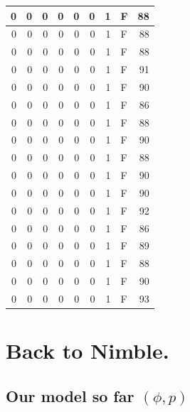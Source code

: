 \documentclass[
  12pt,
]{krantz}
\begin{document}
\begin{tabular}{r|r|r|r|r|r|r|l|r}
\hline
0 & 0 & 0 & 0 & 0 & 0 & 1 & F & 88\\
\hline
0 & 0 & 0 & 0 & 0 & 0 & 1 & F & 88\\
\hline
0 & 0 & 0 & 0 & 0 & 0 & 1 & F & 88\\
\hline
0 & 0 & 0 & 0 & 0 & 0 & 1 & F & 91\\
\hline
0 & 0 & 0 & 0 & 0 & 0 & 1 & F & 90\\
\hline
0 & 0 & 0 & 0 & 0 & 0 & 1 & F & 86\\
\hline
0 & 0 & 0 & 0 & 0 & 0 & 1 & F & 88\\
\hline
0 & 0 & 0 & 0 & 0 & 0 & 1 & F & 90\\
\hline
0 & 0 & 0 & 0 & 0 & 0 & 1 & F & 88\\
\hline
0 & 0 & 0 & 0 & 0 & 0 & 1 & F & 90\\
\hline
0 & 0 & 0 & 0 & 0 & 0 & 1 & F & 90\\
\hline
0 & 0 & 0 & 0 & 0 & 0 & 1 & F & 92\\
\hline
0 & 0 & 0 & 0 & 0 & 0 & 1 & F & 86\\
\hline
0 & 0 & 0 & 0 & 0 & 0 & 1 & F & 89\\
\hline
0 & 0 & 0 & 0 & 0 & 0 & 1 & F & 88\\
\hline
0 & 0 & 0 & 0 & 0 & 0 & 1 & F & 90\\
\hline
0 & 0 & 0 & 0 & 0 & 0 & 1 & F & 93\\
\hline
\end{tabular}

\hypertarget{back-to-nimble.}{%
\section{Back to Nimble.}\label{back-to-nimble.}}

\hypertarget{our-model-so-far-phi-p}{%
\subsection{\texorpdfstring{Our model so far \((\phi, p)\)}{Our model so far (\textbackslash phi, p)}}\label{our-model-so-far-phi-p}}
\end{document}
